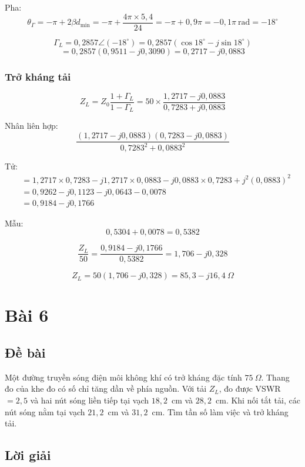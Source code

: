 \documentclass[12pt,a4paper]{article}
\begin{document}
Pha:
\[
\theta_\Gamma = -\pi + 2\beta d_{\min} = -\pi + \frac{4\pi \times 5{,}4}{24} = -\pi + 0{,}9\pi = -0{,}1\pi~\text{rad} = -18^\circ
\]

\[
\Gamma_L = 0{,}2857\angle(-18^\circ) = 0{,}2857(\cos 18^\circ - j\sin 18^\circ)
\]
\[
= 0{,}2857(0{,}9511 - j0{,}3090) = 0{,}2717 - j0{,}0883
\]

\subsubsection{Trở kháng tải}

\[
Z_L = Z_0 \frac{1 + \Gamma_L}{1 - \Gamma_L} = 50 \times \frac{1{,}2717 - j0{,}0883}{0{,}7283 + j0{,}0883}
\]

Nhân liên hợp:
\[
\frac{(1{,}2717 - j0{,}0883)(0{,}7283 - j0{,}0883)}{0{,}7283^2 + 0{,}0883^2}
\]

Tử:
\begin{align*}
&= 1{,}2717 \times 0{,}7283 - j1{,}2717 \times 0{,}0883 - j0{,}0883 \times 0{,}7283 + j^2(0{,}0883)^2 \\
&= 0{,}9262 - j0{,}1123 - j0{,}0643 - 0{,}0078 \\
&= 0{,}9184 - j0{,}1766
\end{align*}

Mẫu:
\[
0{,}5304 + 0{,}0078 = 0{,}5382
\]

\[
\frac{Z_L}{50} = \frac{0{,}9184 - j0{,}1766}{0{,}5382} = 1{,}706 - j0{,}328
\]

\[
\boxed{Z_L = 50(1{,}706 - j0{,}328) = 85{,}3 - j16{,}4~\Omega}
\]

\newpage
\section{Bài 6}

\subsection{Đề bài}
Một đường truyền sóng điện môi không khí có trở kháng đặc tính $75~\Omega$. Thang đo của khe đo có số chỉ tăng dần về phía nguồn. Với tải $Z_L$, đo được VSWR $= 2{,}5$ và hai nút sóng liền tiếp tại vạch $18{,}2$~cm và $28{,}2$~cm. Khi nối tắt tải, các nút sóng nằm tại vạch $21{,}2$~cm và $31{,}2$~cm. Tìm tần số làm việc và trở kháng tải.

\subsection{Lời giải}
\end{document}
